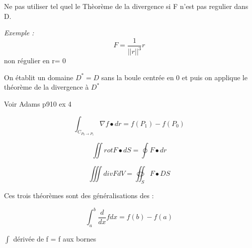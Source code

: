 \begin{myrem}
Ne pas utiliser tel quel le Thèorème de la divergence si F n'est pas regulier dans D.


\emph{Exemple :} \[F = \dfrac{1}{||r||^3} r \] non régulier en r= 0

On établit un domaine $ D^* =D $ sans la boule centrée en 0 et puis on applique le théorème de la divergence à $D^*$

Voir Adams p910 ex 4
\end{myrem}

\begin{myrem}
\[\int_{C_{P_0 \to P_1}} \nabla f \bullet dr = f(P_1) - f(P_0) \]

\[\iint rot F \bullet dS = \oint F \bullet dr \]

\[\iiint div F dV = \oiint_S F \bullet DS\]

Ces trois théorèmes sont des généralisations des :


\[\int_a^b \frac{d}{dx}f dx = f(b) - f(a) \]

$\int$ dérivée de f = f aux bornes
\end{myrem}
